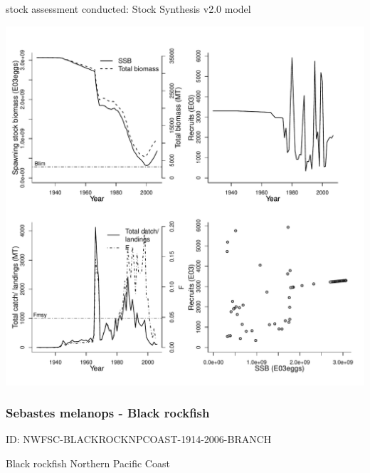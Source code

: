 stock assessment conducted: Stock Synthesis v2.0 model 
\begin{center}
\vspace{-0.2cm}\includegraphics[scale=0.65]{../tex/figures/plot-NWFSC-DKROCKPCOAST-1928-2007-BRANCH.pdf}
\end{center}

\newpage
\subsubsection{Sebastes melanops - Black rockfish}
ID: NWFSC-BLACKROCKNPCOAST-1914-2006-BRANCH

Black rockfish Northern Pacific Coast 

